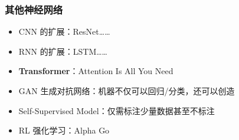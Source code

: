 \begin{frame}
    \frametitle{其他神经网络}
    \begin{itemize}
        \item CNN 的扩展：ResNet……
        \item RNN 的扩展：LSTM……
        \item \textbf{Transformer}：Attention Is All You Need
        \item GAN 生成对抗网络：机器不仅可以回归/分类，还可以创造
        \item Self-Supervised Model：仅需标注少量数据甚至不标注
        \item RL 强化学习：Alpha Go
    \end{itemize}
\end{frame}
